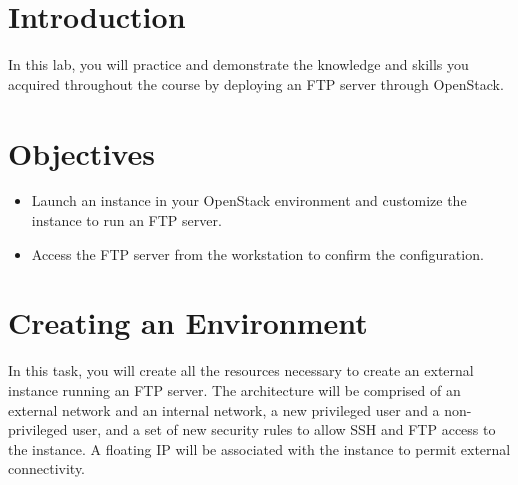 \documentclass[letterpaper, 12pt]{article}
\begin{document}

\section*{Introduction}
\label{sec:introduction}
In this lab, you will practice and demonstrate the knowledge and skills you acquired throughout the course by deploying
an FTP server through OpenStack.

\section*{Objectives}
\label{sec:objectives}
\begin{itemize}[itemsep=0pt]
    \item Launch an instance in your OpenStack environment and customize the instance to run an FTP server.
    \item Access the FTP server from the workstation to confirm the configuration.
\end{itemize}
\clearpage

\labsettings

\section{Creating an Environment}
\label{sec:creating_an_environment}
In this task, you will create all the resources necessary to create an external instance running an FTP server. The
architecture will be comprised of an external network and an internal network, a new privileged user and a
non-privileged user, and a set of new security rules to allow SSH and FTP access to the instance. A floating IP will be
associated with the instance to permit external connectivity.
\end{document}

